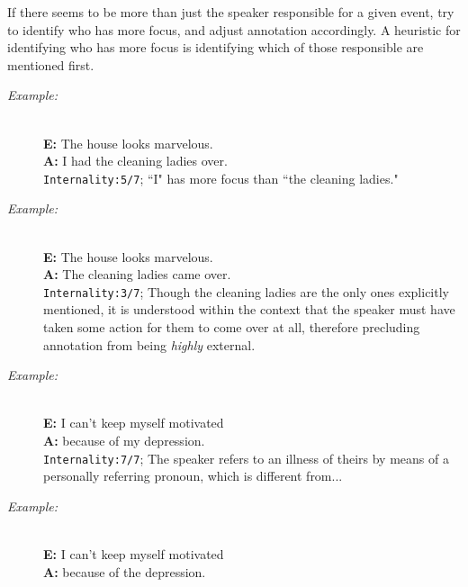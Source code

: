 \documentclass[a4paper,12pt]{article}
\begin{document}
\begin{enumerate}
\begin{description}
            If there seems to be more than just the speaker responsible for a given event, try to identify who has more focus, and adjust annotation accordingly. A heuristic for identifying who has more focus is identifying which of those responsible are mentioned first.
                \begin{description}
                \item[\emph{Example:}]\mbox{}\\
                \textbf{E:} The house looks marvelous.\\ 
                \textbf{A:} I had the cleaning ladies over.\\
                \texttt{Internality:5/7}; ``I" has more focus than ``the cleaning ladies."
                \end{description}
                \begin{description}
                \item[\emph{Example:}]\mbox{}\\
                \textbf{E:} The house looks marvelous.\\ 
                \textbf{A:} The cleaning ladies came over.\\
                \texttt{Internality:3/7}; Though the cleaning ladies are the only ones explicitly mentioned, it is understood within the context that the speaker must have taken some action for them to come over at all, therefore precluding annotation from being \emph{highly} external.  
                \end{description}
                \begin{description}
                \item[\emph{Example:}]\mbox{}\\
                \textbf{E:} I can't keep myself motivated\\ 
                \textbf{A:} because of my depression.\\
                \texttt{Internality:7/7}; The speaker refers to an illness of theirs by means of a personally referring pronoun, which is different from...
                \end{description}
                \begin{description}
                \item[\emph{Example:}]\mbox{}\\
                \textbf{E:} I can't keep myself motivated\\ 
                \textbf{A:} because of the depression.\\

\end{description}
\end{description}
\end{enumerate}
\end{document}
